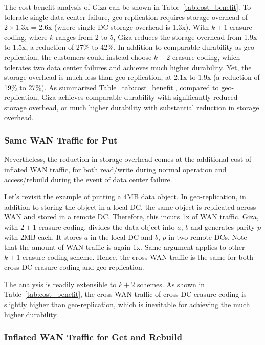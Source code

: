 The cost-benefit analysis of Giza can be shown in Table~\ref{tab:cost_benefit}.
To tolerate single data center failure, geo-replication requires storage overhead of $2\times1.3$x = 2.6x (where single DC storage overhead is 1.3x). With $k+1$ erasure coding, where $k$ ranges from 2 to 5, Giza reduces the storage overhead from 1.9x to 1.5x, a reduction of 27\% to 42\%. In addition to comparable durability as geo-replication, the customers could instead choose $k+2$ erasure coding, which tolerates two data center failures and achieves much higher durability. Yet, the storage overhead is much less than geo-replication, at 2.1x to 1.9x (a reduction of 19\% to 27\%). As summarized Table~\ref{tab:cost_benefit}, compared to geo-replication, Giza achieves comparable durability with significantly reduced storage overhead, or much higher durability with substantial reduction in storage overhead.

\subsubsection{Same WAN Traffic for Put}

Nevertheless, the reduction in storage overhead comes at the additional cost of inflated WAN traffic, for both read/write during normal operation and access/rebuild during the event of data center failure.

Let's revisit the example of putting a 4MB data object. In geo-replication, in addition to storing the object in a local DC, the same object is replicated across WAN and stored in a remote DC. Therefore, this incurs 1x of WAN traffic. Giza, with $2 + 1$ erasure coding, divides the data object into $a$, $b$ and generates parity $p$ with 2MB each. It stores $a$ in the local DC and $b$, $p$ in two remote DCs. Note that the amount of WAN traffic is again 1x. Same argument applies to other $k+1$ erasure coding scheme. Hence, the cross-WAN traffic is the same for both cross-DC erasure coding and geo-replication.

The analysis is readily extensible to $k+2$ schemes. As shown in Table~\ref{tab:cost_benefit}, the cross-WAN traffic of cross-DC erasure coding is slightly higher than geo-replication, which is inevitable for achieving the much higher durability.

\subsubsection{Inflated WAN Traffic for Get and Rebuild}


